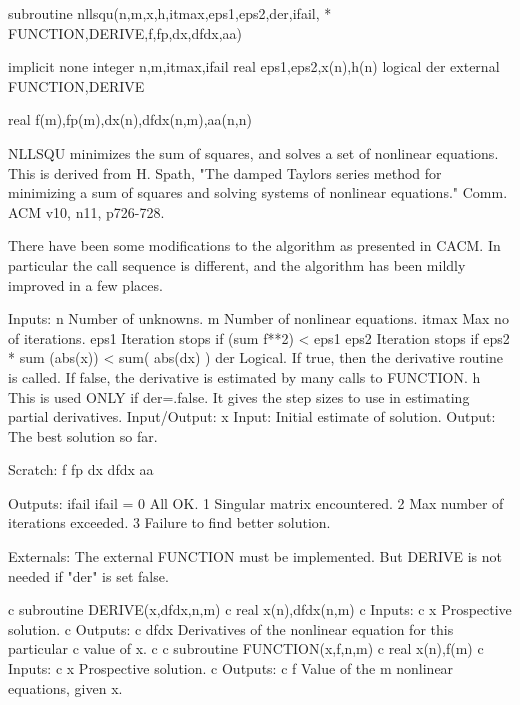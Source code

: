 \par{\tenpoint
{\eightpoint\begintt
        subroutine nllsqu(n,m,x,h,itmax,eps1,eps2,der,ifail,
     *    FUNCTION,DERIVE,f,fp,dx,dfdx,aa)

        implicit none
        integer n,m,itmax,ifail
        real eps1,eps2,x(n),h(n)
        logical der
        external FUNCTION,DERIVE

        real f(m),fp(m),dx(n),dfdx(n,m),aa(n,n)

  NLLSQU minimizes the sum of squares, and solves a set of nonlinear
  equations. This is derived from H. Spath, "The damped Taylors series
  method for minimizing a sum of squares and solving systems of nonlinear
  equations." Comm. ACM v10, n11, p726-728.

  There have been some modifications to the algorithm as presented in CACM.
  In particular the call sequence is different, and the algorithm has been
  mildly improved in a few places.

  Inputs:
    n          Number of unknowns.
    m          Number of nonlinear equations.
    itmax      Max no of iterations.
    eps1       Iteration stops if (sum f**2) < eps1
    eps2       Iteration stops if eps2 * sum (abs(x)) < sum( abs(dx) )
    der        Logical. If true, then the derivative routine is called. If
               false, the derivative is estimated by many calls to FUNCTION.
    h          This is used ONLY if der=.false. It gives the step sizes
               to use in estimating partial derivatives.
  Input/Output:
    x          Input: Initial estimate of solution.
               Output: The best solution so far.

  Scratch:
    f
    fp
    dx
    dfdx
    aa

  Outputs:
    ifail      ifail = 0 All OK.
                       1 Singular matrix encountered.
                       2 Max number of iterations exceeded.
                       3 Failure to find better solution.

  Externals:
       The external FUNCTION must be implemented. But DERIVE is not
       needed if "der" is set false.

c      subroutine DERIVE(x,dfdx,n,m)
c      real x(n),dfdx(n,m)
c Inputs:
c      x       Prospective solution.
c Outputs:
c      dfdx    Derivatives of the nonlinear equation for this particular
c              value of x.
c
c      subroutine FUNCTION(x,f,n,m)
c      real x(n),f(m)
c Inputs:
c      x       Prospective solution.
c Outputs:
c      f       Value of the m nonlinear equations, given x.
\endtt}
\par}

